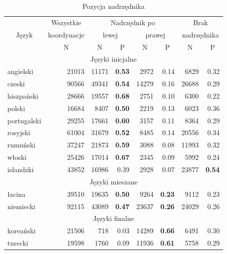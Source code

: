\begin{table}[h]
\centering
\begin{tabular}{lrrrrrrr}
  \toprule
& \multicolumn{1}{c}{Wszystkie}	& \multicolumn{4}{c}{Nadrzędnik po} 	& \multicolumn{2}{c}{Brak} \\
\multicolumn{1}{c}{Język}	& \multicolumn{1}{c}{koordynacje}	
& \multicolumn{2}{c}{lewej}			& \multicolumn{2}{c}{prawej}	& \multicolumn{2}{c}{nadrzędnika} \\
& \multicolumn{1}{c}{N} & 
\multicolumn{1}{c}{N} & \multicolumn{1}{c}{P} & \multicolumn{1}{c}{N} &
\multicolumn{1}{c}{P} & \multicolumn{1}{c}{N} & \multicolumn{1}{c}{P} \\
\midrule
\multicolumn{8}{c}{Języki inicjalne} \\
\midrule
angielski 	& 21013 & 11171 & \textbf{0.53} & 2972  & 0.14 & 6829  & 0.32 \\
czeski 		& 90566 & 49341 & \textbf{0.54} & 14279 & 0.16 & 26688 & 0.29 \\ 
hiszpański	& 28666 & 19557 & \textbf{0.68} & 2751  & 0.10 & 6300  & 0.22 \\ 
polski 		& 16684 & 8407  & \textbf{0.50} & 2219  & 0.13 & 6023  & 0.36 \\ 
portugalski 	& 29255 & 17661 & \textbf{0.60} & 3157  & 0.11 & 8364  & 0.29 \\  
rosyjski		& 61004 & 31679 & \textbf{0.52} & 8485  & 0.14 & 20556 & 0.34 \\ 
rumuński 	& 37247 & 21873 & \textbf{0.59} & 3088  & 0.08 & 11993 & 0.32 \\
włoski		& 25426 & 17014 & \textbf{0.67} & 2345  & 0.09 & 5992  & 0.24 \\ 
\hdashline 
islandzki 	& 43852 & 16986 & 0.39 & 2928 & 0.07 & 23877 & \textbf{0.54} \\ 
\midrule
\multicolumn{8}{c}{Języki mieszane} \\
\midrule
łacina 		& 39510 & 19635 & \textbf{0.50} & 9264  & \textbf{0.23} & 9112  & 0.23 \\ 
niemiecki 	& 92115 & 43089 & \textbf{0.47} & 23637 & \textbf{0.26} & 24029 & 0.26 \\ 
\midrule
\multicolumn{8}{c}{Języki finalne} \\
\midrule
koreański	& 21506 & 718   & 0.03 & 14289 & \textbf{0.66} & 6491 & 0.30 \\ 
turecki		& 19598 & 1760  & 0.09 & 11936 & \textbf{0.61} & 5758 & 0.29 \\ 
\bottomrule
\end{tabular}
\caption{Pozycja nadrzędnika}
\label{tab:pozycja-nadrzędnika}
\end{table}